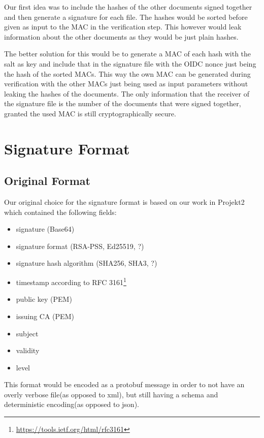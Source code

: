 Our first idea was to include the hashes of the other documents signed together and then generate a signature for each file.
The hashes would be sorted before given as input to the \gls{MAC} in the verification step.
This however would leak information about the other documents as they would be just plain hashes.

The better solution for this would be to generate a \gls{MAC} of each hash with the salt as key and include that in the signature file with the \gls{OIDC} nonce just being the hash of the sorted \gls{MAC}s.
This way the own \gls{MAC} can be generated during verification with the other \gls{MAC}s just being used as input parameters without leaking the hashes of the documents.
The only information that the receiver of the signature file is the number of the documents that were signed together, granted the used \gls{MAC} is still cryptographically secure.

\section{Signature Format}
\label{sec:signatureformat}

\subsection{Original Format}
Our original choice for the signature format is based on our work in Projekt2 which contained the following fields:

\begin{itemize}
    \item signature (Base64)
    \item signature format (\gls{RSA-PSS}, \gls{Ed25519}, ?)
    \item signature hash algorithm (\gls{SHA}256, \gls{SHA}3, ?)
    \item timestamp according to \gls{RFC} 3161\footnote{\url{https://tools.ietf.org/html/rfc3161}}
    \item public key (\gls{PEM})
    \item issuing \gls{CA} (\gls{PEM})
    \item subject
    \item validity
    \item level
\end{itemize}

This format would be encoded as a protobuf message in order to not have an overly verbose file(as opposed to xml), but still having a schema and deterministic encoding(as opposed to json).

